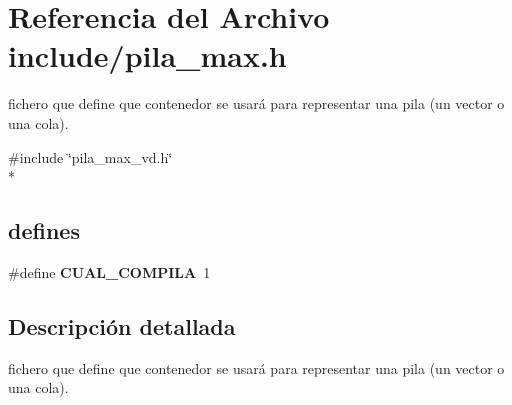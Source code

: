 \section{Referencia del Archivo include/pila\+\_\+max.h}
\label{pila__max_8h}


fichero que define que contenedor se usará para representar una pila (un vector o una cola).  


{\ttfamily \#include \char`\"{}pila\+\_\+max\+\_\+vd.\+h\char`\"{}}\\*
\subsection*{\textquotesingle{}defines\textquotesingle{}}
\begin{DoxyCompactItemize}
\item 
\#define {\bfseries C\+U\+A\+L\+\_\+\+C\+O\+M\+P\+I\+LA}~1\label{pila__max_8h_a5ee137079c448f8e19ee449bd929fa1e}

\end{DoxyCompactItemize}


\subsection{Descripción detallada}
fichero que define que contenedor se usará para representar una pila (un vector o una cola). 

